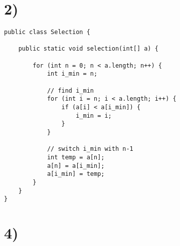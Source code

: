 \documentclass[12pt]{article}
\date{}
\begin{document}
\section{2)}
\begin{lstlisting}
public class Selection {

    public static void selection(int[] a) {

        for (int n = 0; n < a.length; n++) {
            int i_min = n;

            // find i_min
            for (int i = n; i < a.length; i++) {
                if (a[i] < a[i_min]) {
                    i_min = i;
                }
            }

            // switch i_min with n-1
            int temp = a[n];
            a[n] = a[i_min];
            a[i_min] = temp;
        }
    }
}
\end{lstlisting}

\pagebreak

\section{4)}
\end{document}
